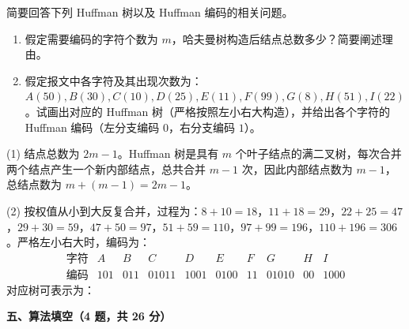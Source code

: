 \begin{question}
简要回答下列 Huffman 树以及 Huffman 编码的相关问题。
\begin{enumerate}
  \item 假定需要编码的字符个数为 $m$，哈夫曼树构造后结点总数多少？简要阐述理由。
  \item 假定报文中各字符及其出现次数为：$A(50),B(30),C(10),D(25),E(11),F(99),G(8),H(51),I(22)$。试画出对应的 Huffman 树（严格按照左小右大构造），并给出各个字符的 Huffman 编码（左分支编码 $0$，右分支编码 $1$）。
\end{enumerate}
\begin{solution}
(1) 结点总数为 $2m-1$。Huffman 树是具有 $m$ 个叶子结点的满二叉树，每次合并两个结点产生一个新内部结点，总共合并 $m-1$ 次，因此内部结点数为 $m-1$，总结点数为 $m+(m-1)=2m-1$。\par
(2) 按权值从小到大反复合并，过程为：$8+10=18$，$11+18=29$，$22+25=47$，$29+30=59$，$47+50=97$，$51+59=110$，$97+99=196$，$110+196=306$。严格左小右大时，编码为：
\[
\begin{array}{c|ccccccccc}
\text{字符} & A&B&C&D&E&F&G&H&I \\ \hline
\text{编码} & 101&011&01011&1001&0100&11&01010&00&1000
\end{array}
\]
对应树可表示为：
\begin{center}
\end{center}
\end{solution}
\end{question}

\textbf{五、算法填空（4 题，共 26 分）}


